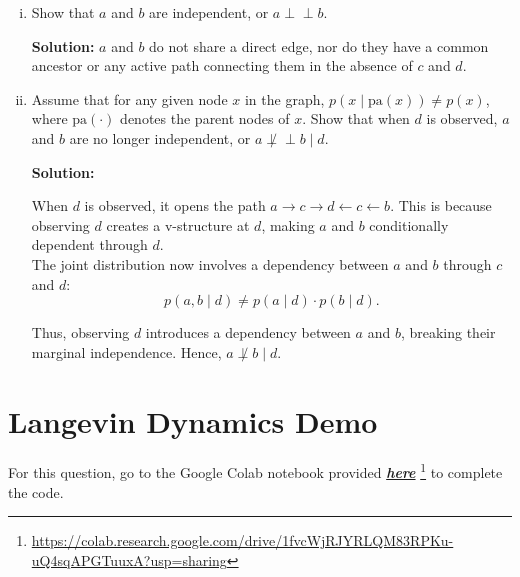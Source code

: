 \documentclass{article}
\newcommand{\Question}[1]{\Large \section{ #1 } \normalsize}
\newcommand{\statind}{\perp\!\!\!\perp}
\newenvironment{solution}{\color{blue} \smallskip \textbf{Solution:}}{}
\begin{document}
\begin{enumerate}[(a)]
\begin{enumerate}[(i)]
        \begin{solution}
1+1+4+2=8 parameters.
        \end{solution}

        \item 
        Show that $a$ and $b$ are independent, or \(a \statind b\). 

        \begin{solution}
\( a \) and \( b \) do not share a direct edge, nor do they have a common ancestor or any active path connecting them in the absence of \( c \) and \( d \).

        \end{solution}

        \item 
        Assume that for any given node $x$ in the graph, $p(x \mid \text{pa}(x)) \neq p(x)$, where $\text{pa}(\cdot)$ denotes the parent nodes of $x$. 
        Show that when $d$ is observed, $a$ and $b$ are no longer independent, or \(a \not\statind b \mid d\). 

        \begin{solution}
        
When \( d \) is observed, it opens the path \( a \to c \to d \gets c \gets b \). This is because observing \( d \) creates a v-structure at \( d \), making \( a \) and \( b \) conditionally dependent through \( d \).\\

The joint distribution now involves a dependency between \( a \) and \( b \) through \( c \) and \( d \):
\[
p(a, b \mid d) \neq p(a \mid d) \cdot p(b \mid d).
\]

Thus, observing \( d \) introduces a dependency between \( a \) and \( b \), breaking their marginal independence. Hence, \( a \not\perp b \mid d \).

        \end{solution}
    \end{enumerate}
\end{enumerate}


\newpage
\Question{Langevin Dynamics Demo}
\newcommand{\notebookurl}{https://colab.research.google.com/drive/1fvcWjRJYRLQM83RPKu-uQ4sqAPGTuuxA?usp=sharing} 

For this question, go to the Google Colab notebook provided \href{\notebookurl}{\textbf{\emph{here}}} \footnote{\href{\notebookurl}{\notebookurl}} to complete the code.
\end{document}

